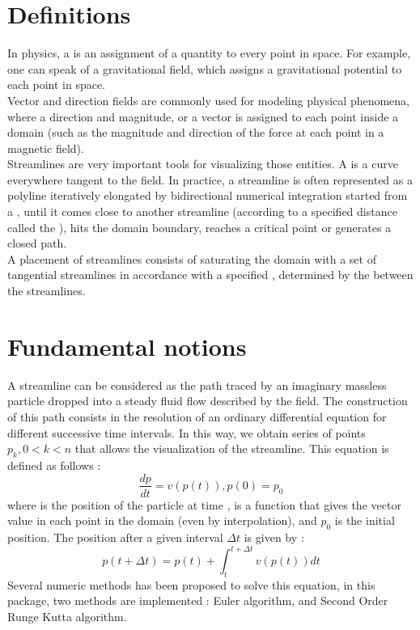 \section{Definitions}
\label{Section_2D_Streamlines_Definitions}
In physics, a  is an assignment of a quantity to every point in
space. For example, one can speak of a gravitational field, which assigns a
gravitational potential to each point in space.\\
Vector and direction fields are commonly used for modeling physical phenomena,
where a direction and magnitude,
or a vector is assigned to each point inside a domain (such as the magnitude and
direction of the force at each point in a magnetic field).\\
Streamlines are very important tools for visualizing those entities. A
 is a curve everywhere tangent to the field. In practice, 
a streamline is often represented as a polyline iteratively elongated by 
bidirectional numerical integration started from a , until 
it comes close to another streamline (according to a specified distance called 
the ), hits the domain boundary, reaches a 
critical point or generates a closed path.\\
A  placement of streamlines consists of saturating the domain with a set of tangential streamlines  in accordance with a specified , determined by the  between the streamlines.

\section{Fundamental notions}
\label{Section_2D_Streamlines_Fundamental_notions}
A streamline can be considered as the path traced by an imaginary massless particle dropped into a steady fluid flow described by the field. The construction of this path consists in the resolution of an ordinary differential equation for different successive time intervals. In this way, we obtain series of points $p_k, 0<k<n$ that allows the visualization of the streamline.
This equation is defined as follows : $$\frac{dp}{dt} = v(p(t)), p(0) = p_0$$ where  is the position of the particle at time ,  is a function that gives the vector value in each point in the domain (even by interpolation), and $p_0$ is the initial position.
The position after a given interval $\Delta t$ is given by : $$p(t + \Delta t) = p(t) + \int_t^{t+\Delta t} v(p(t)) dt$$
Several numeric methods has been proposed to solve this equation, in this package, two methods are implemented : Euler algorithm, and Second Order Runge Kutta algorithm.

